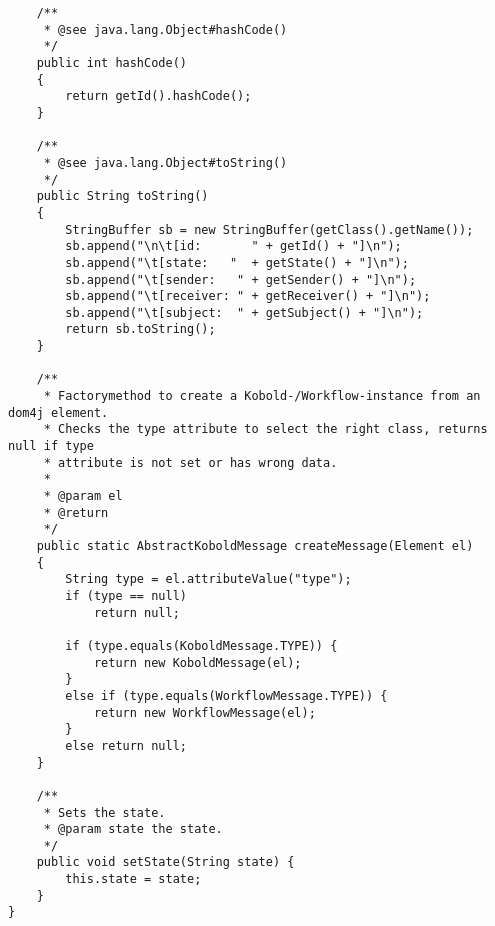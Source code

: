 \begin{verbatim}
	/**
	 * @see java.lang.Object#hashCode()
	 */
	public int hashCode() 
	{
		return getId().hashCode();
	}

	/**
	 * @see java.lang.Object#toString()
	 */
	public String toString() 
	{
		StringBuffer sb = new StringBuffer(getClass().getName());
		sb.append("\n\t[id:       " + getId() + "]\n");
		sb.append("\t[state:   "  + getState() + "]\n");
		sb.append("\t[sender:   " + getSender() + "]\n");
		sb.append("\t[receiver: " + getReceiver() + "]\n");
		sb.append("\t[subject:  " + getSubject() + "]\n");
		return sb.toString();
	}

	/**
	 * Factorymethod to create a Kobold-/Workflow-instance from an dom4j element.
	 * Checks the type attribute to select the right class, returns null if type
	 * attribute is not set or has wrong data.
	 * 
	 * @param el
	 * @return
	 */
	public static AbstractKoboldMessage createMessage(Element el)
	{
		String type = el.attributeValue("type");
		if (type == null)
			return null;
		
		if (type.equals(KoboldMessage.TYPE)) {
			return new KoboldMessage(el);
		}
		else if (type.equals(WorkflowMessage.TYPE)) {
			return new WorkflowMessage(el);
		}
		else return null;	
	}

	/**
	 * Sets the state.
	 * @param state the state.
	 */
	public void setState(String state) {
		this.state = state;
	}
}

\end{verbatim}
